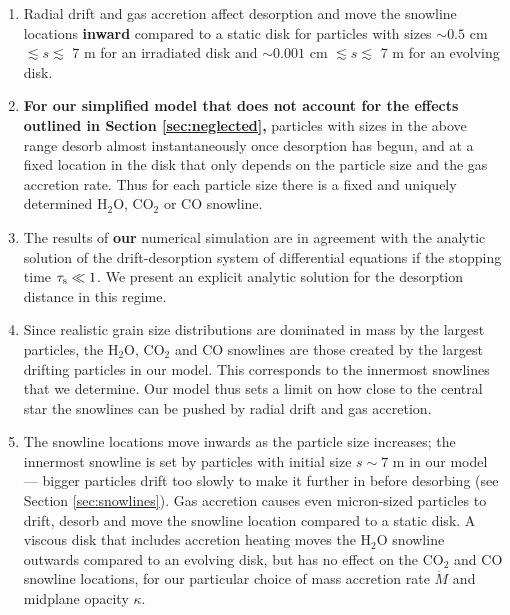\documentclass[apj]{emulateapj}
\begin{document}
\begin{enumerate}
\item Radial drift and gas accretion affect desorption and move the snowline locations \textbf{inward} compared to a static disk for particles with sizes $\sim$$0.5$ cm $\lesssim s \lesssim$ 7 m for an irradiated disk and $\sim$$0.001$ cm $\lesssim s \lesssim$ 7 m for an evolving disk. %

\item \textbf{For our simplified model that does not account for the effects outlined in Section \ref{sec:neglected},} particles with sizes in the above range desorb almost instantaneously once desorption has begun, and at a fixed location in the disk that only depends on the particle size and the gas accretion rate. Thus for each particle size there is a fixed and uniquely determined H$_2$O, CO$_2$ or CO snowline. 

\item The results of \textbf{our} numerical simulation are in agreement with the analytic solution of the drift-desorption system of differential equations if the stopping time $\tau_{\rm s} \ll 1$. We present an explicit analytic solution for the desorption distance in this regime.  



\item Since realistic grain size distributions are dominated in mass by the largest particles, the H$_2$O, CO$_2$ and CO snowlines are those created by the largest drifting particles in our model. This corresponds to the innermost snowlines that we determine. Our model thus sets a limit on how close to the central star the snowlines can be pushed by radial drift and gas accretion.

\item The snowline locations move inwards as the particle size increases; the innermost snowline is set by particles with initial size $s \sim 7$ m in our model --- bigger particles drift too slowly to make it further in before desorbing (see Section \ref{sec:snowlines}). Gas accretion causes even micron-sized particles to drift, desorb and move the snowline location compared to a static disk. A viscous disk that includes accretion heating moves the H$_2$O snowline outwards compared to an evolving disk, but has no effect on the CO$_2$ and CO snowline locations, for our particular choice of mass accretion rate $\dot{M}$ and midplane opacity $\kappa$. %


\end{enumerate}
\end{document}
